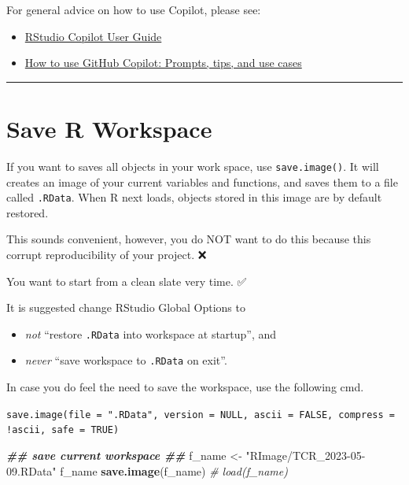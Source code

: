 \documentclass[
  a4paper,
  twoside,
  openright]{book}
\newenvironment{Shaded}{\begin{snugshade}}{\end{snugshade}}
\newcommand{\CommentTok}[1]{\textcolor[rgb]{0.56,0.35,0.01}{\textit{#1}}}
\newcommand{\DocumentationTok}[1]{\textcolor[rgb]{0.56,0.35,0.01}{\textbf{\textit{#1}}}}
\newcommand{\FunctionTok}[1]{\textcolor[rgb]{0.13,0.29,0.53}{\textbf{#1}}}
\newcommand{\NormalTok}[1]{#1}
\newcommand{\OtherTok}[1]{\textcolor[rgb]{0.56,0.35,0.01}{#1}}
\newcommand{\StringTok}[1]{\textcolor[rgb]{0.31,0.60,0.02}{#1}}
\providecommand{\tightlist}{%
  \setlength{\itemsep}{0pt}\setlength{\parskip}{0pt}}
\theoremstyle{definition}
\theoremstyle{definition}
\theoremstyle{definition}
\theoremstyle{definition}
\theoremstyle{remark}
\begin{document}
For general advice on how to use Copilot, please see:

\begin{itemize}
\tightlist
\item
  \href{https://docs.posit.co/ide/user/ide/guide/tools/copilot.html}{RStudio Copilot User Guide}
\item
  \href{https://github.blog/2023-06-20-how-to-write-better-prompts-for-github-copilot/}{How to use GitHub Copilot: Prompts, tips, and use cases}
\end{itemize}

\begin{center}\rule{0.5\linewidth}{0.5pt}\end{center}

\section{Save R Workspace}\label{save-r-workspace}

If you want to saves {all objects} in your work space, use \texttt{save.image()}. It will creates an image of your current variables and functions, and saves them to a file called \texttt{.RData}. When R next loads, objects stored in this image are by default restored.

This sounds convenient, however, you do NOT want to do this because this corrupt {reproducibility} of your project. ❌

You want to {start from a clean slate} very time. ✅

It is suggested change RStudio Global Options to

\begin{itemize}
\tightlist
\item
  \emph{not} ``restore \texttt{.RData} into workspace at startup'', and
\item
  \emph{never} ``save workspace to \texttt{.RData} on exit''.
\end{itemize}

In case you do feel the need to save the workspace, use the following cmd.

\texttt{save.image(file\ =\ ".RData",\ version\ =\ NULL,\ ascii\ =\ FALSE,\ compress\ =\ !ascii,\ safe\ =\ TRUE)}

\begin{Shaded}
\begin{Highlighting}[]
\DocumentationTok{\#\# save current workspace \#\#}
\NormalTok{f\_name }\OtherTok{\textless{}{-}} \StringTok{"RImage/TCR\_2023{-}05{-}09.RData"}
\NormalTok{f\_name}
\FunctionTok{save.image}\NormalTok{(f\_name)}
\CommentTok{\# load(f\_name)}
\end{Highlighting}
\end{Shaded}
\end{document}
